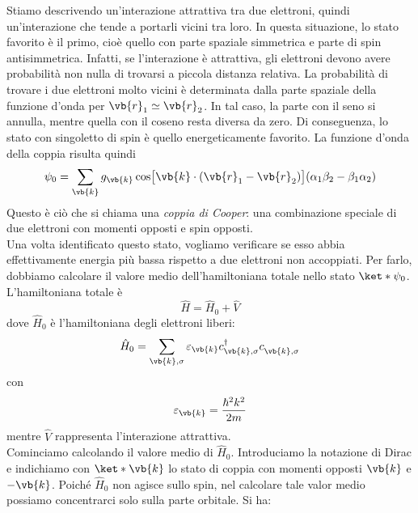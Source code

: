 Stiamo descrivendo un'interazione attrattiva tra due elettroni, quindi un'interazione che tende a portarli vicini tra loro. In questa situazione, lo stato favorito è il primo, cioè quello con parte spaziale simmetrica e parte di spin antisimmetrica. Infatti, se l'interazione è attrattiva, gli elettroni devono avere probabilità non nulla di trovarsi a piccola distanza relativa. La probabilità di trovare i due elettroni molto vicini è determinata dalla parte spaziale della funzione d'onda per $\vb{r}_1 \simeq \vb{r}_2$. In tal caso, la parte con il seno si annulla, mentre quella con il coseno resta diversa da zero. Di conseguenza, lo stato con singoletto di spin è quello energeticamente favorito. La funzione d'onda della coppia risulta quindi
\begin{equation}
   \psi_0
   =\sum_{\vb{k}} g_{\vb{k}}
   \cos\bigl[\vb{k}\cdot(\vb{r}_1-\vb{r}_2)\bigr]
   (\alpha_1\beta_2-\beta_1\alpha_2)
   \label{eq:cooper_pair_wavefunction}
\end{equation}
Questo è ciò che si chiama una \emph{coppia di Cooper}: una combinazione speciale di due elettroni con momenti opposti e spin opposti.\\
Una volta identificato questo stato, vogliamo verificare se esso abbia effettivamente energia più bassa rispetto a due elettroni non accoppiati. Per farlo, dobbiamo calcolare il valore medio dell'hamiltoniana totale nello stato $\ket*{\psi_0}$.\\
L'hamiltoniana totale è
\begin{equation*}
   \hat{H}
   =\hat{H}_0 + \hat{V}
\end{equation*}
dove $\hat{H}_0$ è l'hamiltoniana degli elettroni liberi:
\begin{equation}
   \hat{H}_0
   =\sum_{\vb{k},\sigma} \varepsilon_{\vb{k}} c^{\dag}_{\vb{k},\sigma} c^{\vphantom{\dag}}_{\vb{k},\sigma}
   \label{eq:free_electron_hamiltonian}
\end{equation}
con
\begin{equation*}
   \varepsilon_{\vb{k}}
   =\frac{\hbar^2 k^2}{2m}
\end{equation*}
mentre $\hat{V}$ rappresenta l'interazione attrattiva.\\
Cominciamo calcolando il valore medio di $\hat{H}_0$. Introduciamo la notazione di Dirac e indichiamo con $\ket*{\vb{k}}$ lo stato di coppia con momenti opposti $\vb{k}$ e $-\vb{k}$. Poiché $\hat{H}_0$ non agisce sullo spin, nel calcolare tale valor medio possiamo concentrarci solo sulla parte orbitale. Si ha:
